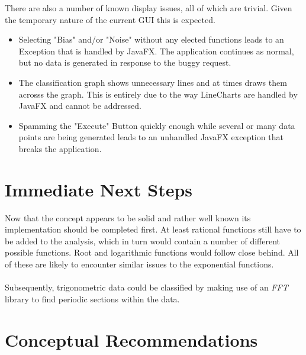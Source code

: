 \documentclass[main.tex]{subfiles}
\begin{document}
    
    
    There are also a number of known display issues, all of which are trivial. Given the temporary nature of the current GUI this is expected.
    \begin{itemize}
      \item Selecting "Bias" and/or "Noise" without any elected functions leads to an Exception that is handled by JavaFX. The application continues as normal, but no data is generated in response to the buggy request.
      \item The classification graph shows unnecessary lines and at times draws them acrosss the graph. This is entirely due to the way LineCharts are handled by JavaFX and cannot be addressed.
      \item Spamming the "Execute" Button quickly enough while several or many data points are being generated leads to an unhandled JavaFX exception that breaks the application.
    \end{itemize}
    
  \section{Immediate Next Steps}
    
    Now that the concept appears to be solid and rather well known its implementation should be completed first. At least rational functions still have to be added to the analysis, which in turn would contain a number of different possible functions. Root and logarithmic functions would follow close behind. All of these are likely to encounter similar issues to the exponential functions.
    \\\\
    Subsequently, trigonometric data could be classified by making use of an \textit{FFT} library to find periodic sections within the data. 
        
  \section{Conceptual Recommendations}
    
\end{document}
